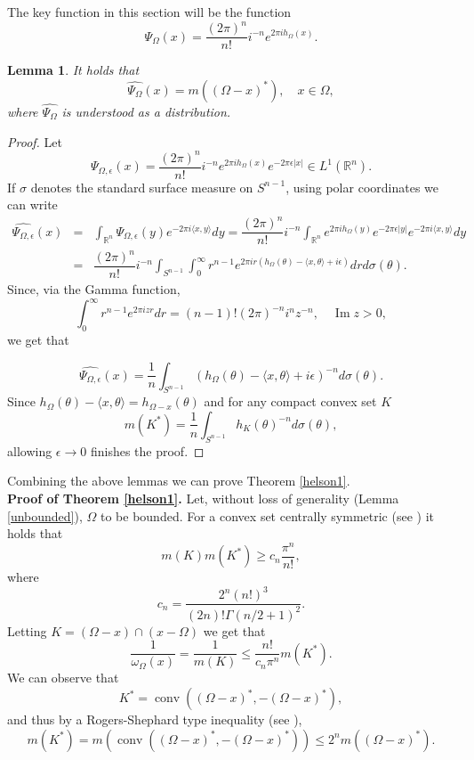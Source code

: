 \documentclass{amsart}
\theoremstyle{plain}
\newtheorem{lm}[theo]{Lemma}
\DeclareMathOperator{\conv}{conv}
\DeclareMathOperator{\Image}{Im}
\begin{document}
The key function in this section will be the function
$$\Psi_\Omega(x)=\dfrac{(2\pi)^n}{n!}i^{-n}e^{2 \pi i h_\Omega(x)}.$$
\begin{lm}\label{psilemma}
	It holds that $$\widehat{\Psi_\Omega}(x)=m((\Omega-x)^\ast), \quad x\in\Omega,$$ where $\widehat{\Psi_\Omega}$ is understood as a distribution.
\end{lm}
\begin{proof}
	Let $$\Psi_{\Omega,\epsilon}(x)=\dfrac{(2\pi)^n}{n!}i^{-n}e^{2 \pi i h_\Omega(x)}e^{-2\pi \epsilon|x|}\in L^1(\mathbb{R}^n).$$ If $\sigma$ denotes the standard surface measure on $S^{n-1}$, using polar coordinates we can write
	\begin{eqnarray} \widehat{\Psi_{\Omega,\epsilon}}(x)&=&\int_{\mathbb{R}^n}\Psi_{\Omega,\epsilon}(y)e^{-2\pi i \langle x,y\rangle}dy=\dfrac{(2\pi)^n}{n!}i^{-n}\int_{\mathbb{R}^n}e^{2 \pi i h_\Omega(y)}e^{-2\pi \epsilon |y|}e^{-2\pi i \langle x,y\rangle}dy \nonumber \\
		&=&\dfrac{(2\pi)^n}{n!}i^{-n}\int_{S^{n-1}}\int_{0}^\infty r^{n-1}e^{2 \pi i r(h_\Omega(\theta)-\langle x,\theta\rangle+i\epsilon)}drd\sigma(\theta).  \nonumber 
	\end{eqnarray} 
	Since, via the Gamma function, $$\int_0^\infty r^{n-1}e^{2\pi i z r}dr=(n-1)!(2\pi)^{-n} i^n z^{-n}, \quad \Image z>0,$$ we get that
	
	$$ \widehat{\Psi_{\Omega,\epsilon}}(x)=\frac{1}{n}\int_{S^{n-1}}  (h_\Omega(\theta)-\langle x,\theta\rangle+i\epsilon)^{-n}d\sigma(\theta). $$
	Since $h_\Omega(\theta)-\langle x,\theta\rangle=h_{\Omega-x}(\theta)$ and for any compact convex set $K$ \cite[Equation (14)]{LangharstRoysdonZvavitch2022}
	$$m(K^\ast)=\frac{1}{n}\int_{S^{n-1}}h_K(\theta)^{-n}d\sigma(\theta),$$ allowing $\epsilon\to 0$ finishes the proof.
\end{proof}
Combining the above lemmas we can prove Theorem \ref{helson1}.
\\	\textbf{Proof of Theorem \ref{helson1}.}  Let, without loss of generality (Lemma \ref{unbounded}), $\Omega$ to be bounded. For a convex set centrally symmetric (see \cite{Kuperberg2008}) it holds that 
$$m(K)m(K^\ast)\geq c_n\frac{\pi^n}{n!},$$ where $$c_n=\frac{2^n (n!)^3}{(2n)!\Gamma(n/2+1)^2}.$$ Letting $K=(\Omega-x)\cap (x-\Omega)$ we get that
$$\frac{1}{\omega_\Omega(x)}=\frac{1}{m(K)}\leq \frac{n!}{c_n \pi^n}m(K^\ast).$$ 
We can observe that 
$$K^\ast=\conv ((\Omega-x)^\ast,-(\Omega-x)^\ast),$$ and thus by a Rogers-Shephard type inequality (see \cite{AlonsoGutierrezEtAl2021,RogersShephard1958}),
$$m(K^\ast)= m(\conv ((\Omega-x)^\ast,-(\Omega-x)^\ast))\leq 2^nm((\Omega-x)^\ast).$$
\end{document}
